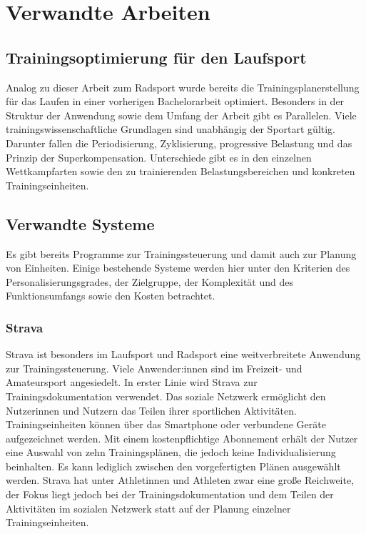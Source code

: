 \chapter{Verwandte Arbeiten}
\label{sec:verwandt}

\section{Trainingsoptimierung für den Laufsport}
\label{sec:verwandt:sec1}
Analog zu dieser Arbeit zum Radsport wurde bereits die Trainingsplanerstellung für das Laufen in einer vorherigen Bachelorarbeit optimiert. Besonders in der Struktur der Anwendung sowie dem Umfang der Arbeit gibt es Parallelen. Viele trainingswissenschaftliche Grundlagen sind unabhängig der Sportart gültig. Darunter fallen die Periodisierung, Zyklisierung, progressive Belastung und das Prinzip der Superkompensation. Unterschiede gibt es in den einzelnen Wettkampfarten sowie den zu trainierenden Belastungsbereichen und konkreten Trainingseinheiten.

\section{Verwandte Systeme}
Es gibt bereits Programme zur Trainingssteuerung und damit auch zur Planung von Einheiten. Einige bestehende Systeme werden hier unter den Kriterien des Personalisierungsgrades, der Zielgruppe, der Komplexität und des Funktionsumfangs sowie den Kosten betrachtet.

\subsection{Strava}
Strava\cite{StravaWeb} ist besonders im Laufsport und Radsport eine weitverbreitete Anwendung zur Trainingssteuerung. Viele Anwender:innen sind im Freizeit- und Amateursport angesiedelt. In erster Linie wird Strava zur Trainingsdokumentation verwendet. Das soziale Netzwerk ermöglicht den Nutzerinnen und  Nutzern das Teilen ihrer sportlichen Aktivitäten. Trainingseinheiten können über das Smartphone oder verbundene Geräte aufgezeichnet werden. Mit einem kostenpflichtige Abonnement erhält der Nutzer eine Auswahl von zehn Trainingsplänen, die jedoch keine Individualisierung beinhalten. Es kann lediglich zwischen den vorgefertigten Plänen ausgewählt werden. Strava hat unter Athletinnen und Athleten zwar eine große Reichweite, der Fokus liegt jedoch bei der Trainingsdokumentation und dem Teilen der Aktivitäten im sozialen Netzwerk statt auf der Planung einzelner Trainingseinheiten.

